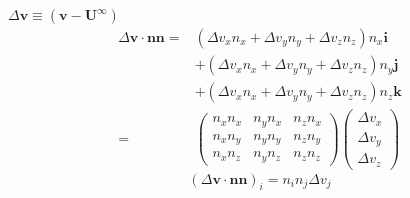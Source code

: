 \documentclass[12pt]{article}
\begin{document}
$\Delta \bm{v} \equiv (\bm{v}- \bm{U}^{\infty})$
\begin{align*}
\Delta \bm{v} \cdot
\bm{n} \bm{n}
= &
(\Delta v_x n_x 
+\Delta v_y n_y
+\Delta v_z n_z) n_x \bm{i}\\
& 
+ (\Delta v_x n_x 
+\Delta v_y n_y
+\Delta v_z n_z) n_y \bm{j}\\
&
+ (\Delta v_x n_x 
+\Delta v_y n_y
+\Delta v_z n_z) n_z \bm{k} \\
=&
\begin{pmatrix}
 n_x n_x &   n_y n_x &   n_z n_x \\
 n_x n_y &   n_y n_y &   n_z n_y \\
 n_x n_z &   n_y n_z &   n_z n_z 
\end{pmatrix}
\begin{pmatrix}
 \Delta v_x \\
 \Delta v_y \\
 \Delta v_z 
\end{pmatrix} 
\end{align*}
\begin{equation*}
(\Delta \bm{v} \cdot
\bm{n} \bm{n})_i
= n_i n_j \Delta v_j
\end{equation*}
\end{document}
